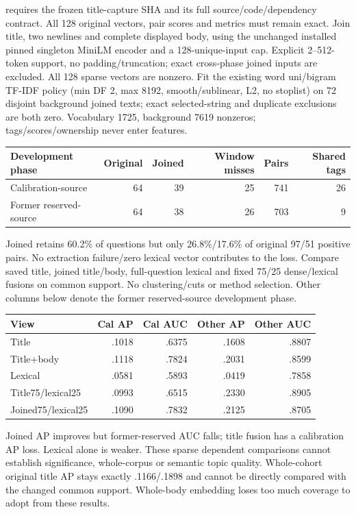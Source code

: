 \documentclass[11pt]{article}
\begin{document}
 requires the frozen title-capture SHA and
its full source/code/dependency contract. All 128 original vectors, pair scores
and metrics must remain exact. Join title, two newlines and complete displayed
body, using the unchanged installed pinned singleton MiniLM encoder and a
128-unique-input cap. Explicit 2--512-token support, no padding/truncation;
exact cross-phase joined inputs are excluded. All 128 sparse vectors are nonzero.
Fit the existing word uni/bigram TF-IDF policy (min DF 2, max 8192, smooth/sublinear,
L2, no stoplist) on 72 disjoint background joined texts; exact selected-string and
duplicate exclusions are both zero. Vocabulary 1725, background 7619 nonzeros;
tags/scores/ownership never enter features.

\begin{center}
\begin{tabular}{lrrrrr}
\toprule
Development phase & Original & Joined & Window misses & Pairs & Shared tags \\
\midrule
Calibration-source & 64 & 39 & 25 & 741 & 26 \\
Former reserved-source & 64 & 38 & 26 & 703 & 9 \\
\bottomrule
\end{tabular}
\end{center}
Joined retains 60.2\% of questions but only 26.8\%/17.6\% of original 97/51
positive pairs. No extraction failure/zero lexical vector contributes to the loss.
Compare saved title, joined title/body, full-question lexical and fixed 75/25
dense/lexical fusions on common support. No clustering/cuts or method selection.
Other columns below denote the former reserved-source development phase.

\begin{center}
\begin{tabular}{lrrrr}
\toprule
View & Cal AP & Cal AUC & Other AP & Other AUC \\
\midrule
Title & .1018 & .6375 & .1608 & .8807 \\
Title+body & .1118 & .7824 & .2031 & .8599 \\
Lexical & .0581 & .5893 & .0419 & .7858 \\
Title75/lexical25 & .0993 & .6515 & .2330 & .8905 \\
Joined75/lexical25 & .1090 & .7832 & .2125 & .8705 \\
\bottomrule
\end{tabular}
\end{center}
Joined AP improves but former-reserved AUC falls; title fusion has a calibration
AP loss. Lexical alone is weaker. These sparse dependent comparisons cannot
establish significance, whole-corpus or semantic topic quality. Whole-cohort
original title AP stays exactly .1166/.1898 and cannot be directly compared
with the changed common support. Whole-body embedding loses too much coverage
to adopt from these results.
\end{document}
